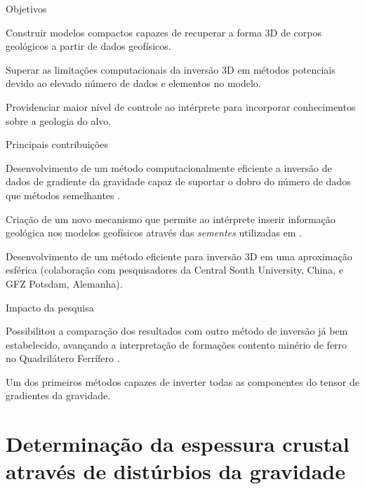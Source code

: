\documentclass[12pt,a4paper,oneside]{book}
\begin{document}
\begin{fancyenum}{\faBullseye}{Objetivos}
   \item Construir modelos compactos capazes de recuperar a forma 3D de corpos
     geológicos a partir de dados geofísicos.
   \item Superar as limitações computacionais da inversão 3D em métodos
     potenciais devido ao elevado número de dados e elementos no modelo.
   \item Providenciar maior nível de controle ao intérprete para incorporar
     conhecimentos sobre a geologia do alvo.
\end{fancyenum}
\begin{fancyenum}{\faLightbulb}{Principais contribuições}
  \item Desenvolvimento de um método computacionalmente eficiente a inversão
    de dados de gradiente da gravidade capaz de suportar o dobro do número
    de dados que métodos semelhantes \citep{Uieda2012,Carlos2016}.
  \item Criação de um novo mecanismo que permite ao intérprete inserir
    informação geológica nos modelos geofísicos através das \textit{sementes}
    utilizadas em \citet{Uieda2012}.
  \item Desenvolvimento de um método eficiente para inversão 3D em uma
    aproximação esférica \citep{Zhao2019} (colaboração com pesquisadores da
    Central South University, China, e GFZ Potsdam, Alemanha).
\end{fancyenum}
\begin{fancyenum}{\faRocket}{Impacto da pesquisa}
  \item Possibilitou a comparação dos resultados com outro método de inversão
    já bem estabelecido, avançando a interpretação de formações contento
    minério de ferro no Quadrilátero Ferrífero \citep{Carlos2014,Carlos2016}.
  \item Um dos primeiros métodos capazes de inverter todas as componentes do
    tensor de gradientes da gravidade.
\end{fancyenum}


\section{Determinação da espessura crustal através de distúrbios da gravidade}
\end{document}
